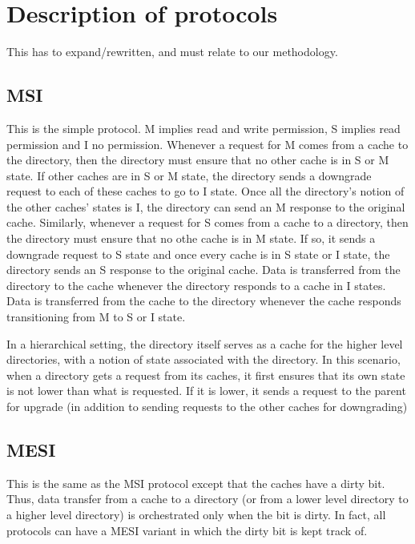 \section{Description of protocols}
\label{sec:protocols}

This has to expand/rewritten, and must relate to our methodology.

\subsection{MSI}
This is the simple protocol. M implies read and write permission, S implies
read permission and I no permission. Whenever a request for M comes from a
cache to the directory, then the directory must ensure that no other cache is in
S or M state. If other caches are in S or M state, the directory sends a
downgrade request to each of these caches to go to I state. Once all the
directory's notion of the other caches' states is I, the directory can send an M
response to the original cache. Similarly, whenever a request for S comes from a
cache to a directory, then the directory must ensure that no othe cache is in M
state. If so, it sends a downgrade request to S state and once every cache is in
S state or I state, the directory sends an S response to the original cache.
Data is transferred from the directory to the cache whenever the directory
responds to a cache in I states. Data is transferred from the cache to the
directory whenever the cache responds transitioning from M to S or I state.

In a hierarchical setting, the directory itself serves as a cache for the higher
level directories, with a notion of state associated with the directory. In this
scenario, when a directory gets a request from its caches, it first ensures that
its own state is not lower than what is requested. If it is lower, it sends a
request to the parent  for upgrade (in addition to sending requests to the other
caches for downgrading)

\subsection{MESI}
This is the same as the MSI protocol except that the caches have a dirty bit.
Thus, data transfer from a cache to a directory (or from a lower level directory
to a higher level directory) is orchestrated only when the bit is dirty. In
fact, all protocols can have a MESI variant in which the dirty bit is kept track
of.


